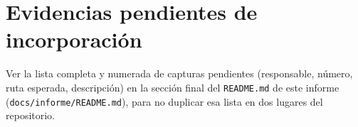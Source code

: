 \section{Evidencias pendientes de incorporaci\'on}

Ver la lista completa y numerada de capturas pendientes (responsable,
n\'umero, ruta esperada, descripci\'on) en la secci\'on final del
\texttt{README.md} de este informe (\texttt{docs/informe/README.md}), para
no duplicar esa lista en dos lugares del repositorio.

